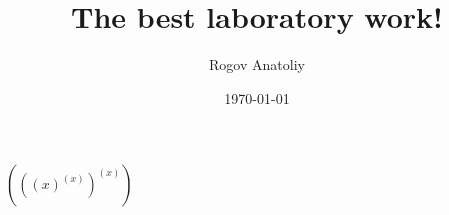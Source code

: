 \documentclass[12pt, letterpaper]{article}
\title{The best laboratory work!}
\author{Rogov Anatoliy}
\date{\today}
\begin{document}
\maketitle
\newpage
$({({(x)}^{(x)})}^{(x)})$
\end{document}
